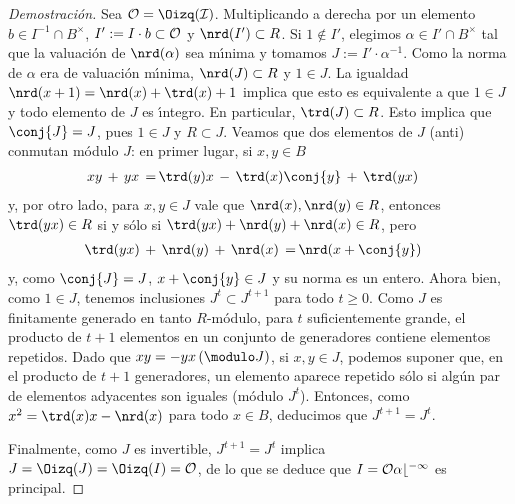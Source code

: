 \begin{proof}[Demostraci\'{o}n]
	Sea $\cal{O}=\Oizq(I)$. Multiplicando a derecha por un elemento
	$b\in I^{-1}\cap B^{\times}$, $I':=I\cdot b\subset\cal{O}$
	y $\nrd(I')\subset R$.
	Si $1\not\in I'$,
	elegimos $\alpha\in I'\cap B^{\times}$ tal que la
	valuaci\'{o}n de $\nrd(\alpha)$ sea m\'{\i}nima y tomamos
	$J:=I'\cdot\alpha^{-1}$. Como la norma de $\alpha$ era de
	valuaci\'{o}n m\'{\i}nima, $\nrd(J)\subset R$ y $1\in J$.
	La igualdad $\nrd(x+1)=\nrd(x)+\trd(x)+1$ implica que esto es
	equivalente a que $1\in J$ y todo elemento de $J$ es \'{\i}ntegro.
	En particular, $\trd(J)\subset R$. Esto implica que $\conj{J}=J$,
	pues $1\in J$ y $R\subset J$. Veamos que dos elementos de $J$
	(anti) conmutan m\'{o}dulo $J$: en primer lugar, si $x,y\in B$
	\begin{align*}
		xy\,+\,yx \,=\, & \trd(y)x\,-\,\trd(x)\conj{y}\,+\,
		\trd(yx)
	\end{align*}
	y, por otro lado, para $x,y\in J$ vale que $\nrd(x),\nrd(y)\in R$,
	entonces
	$\trd(yx)\in R$ si y s\'{o}lo si $\trd(yx)+\nrd(y)+\nrd(x)\in R$,
	pero
	\begin{align*}
		\trd(yx)\,+\,\nrd(y)\,+\,\nrd(x)\,=\, & \nrd(x+\conj{y})
	\end{align*}
	y, como $\conj{J}=J$, $x+\conj{y}\in J$ y su norma es un entero.
	Ahora bien, como $1\in J$, tenemos inclusiones $J^{t}\subset J^{t+1}$
	para todo $t\geq 0$. Como $J$ es finitamente generado en tanto
	$R$-m\'{o}dulo, para $t$ suficientemente grande, el producto de
	$t+1$ elementos en un conjunto de generadores contiene elementos
	repetidos. Dado que $xy=-yx\,(\modulo J)$, si $x,y\in J$, podemos
	suponer que, en el producto de $t+1$ generadores, un elemento
	aparece repetido s\'{o}lo si alg\'{u}n par de elementos adyacentes
	son iguales (m\'{o}dulo $J^{t}$). Entonces, como
	$x^{2}=\trd(x)x-\nrd(x)$ para todo $x\in B$, deducimos que
	$J^{t+1}=J^{t}$.

	Finalmente, como $J$ es invertible, $J^{t+1}=J^{t}$ implica
	$J=\Oizq(J)=\Oizq(I)=\cal{O}$, de lo que se deduce que
	$I=\cal{O}\alpha b^{-1}$ es principal.
\end{proof}

